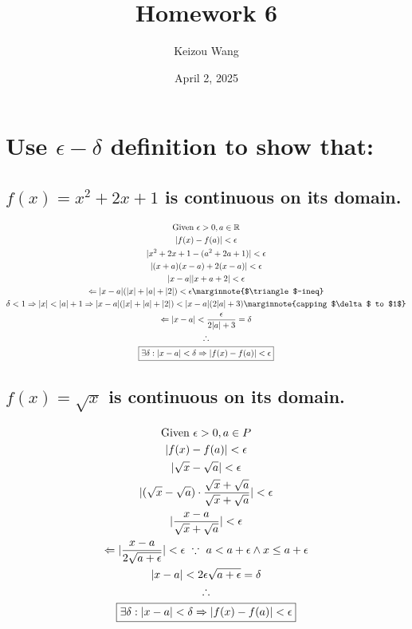 \documentclass[letterpaper]{article}
\title{Homework 6}
\author{Keizou Wang}
\date{April 2, 2025}
\DeclarePairedDelimiter\abs{\lvert}{\rvert}
\begin{document}
\maketitle

\section{Use $\epsilon-\delta$ definition to show that:}
\subsection{$f(x)=x^2+2x+1$ is continuous on its domain.}
\begin{gather*}
	\text{Given } \epsilon>0,a\in\mathbb{R} \\
	\abs{f(x)-f(a)}<\epsilon \\
	\abs{x^2+2x+1-(a^2+2a+1)}<\epsilon \\
	\abs{(x+a)(x-a)+2(x-a)}<\epsilon \\
	\abs{x-a}\abs{x+a+2}<\epsilon \\
	\Leftarrow \abs{x-a}(\abs{x}+\abs{a}+\abs{2})<\epsilon \marginnote{$\triangle$-ineq} \\
	\delta<1\Rightarrow\abs{x}<\abs{a}+1 \Rightarrow \abs{x-a}(\abs{x}+\abs{a}+\abs{2})<\abs{x-a}(2\abs{a}+3)\marginnote{capping $\delta$ to $1$} \\
	\Leftarrow \abs{x-a}<\frac{\epsilon}{2\abs{a}+3}=\delta \\
	\therefore \\
	\boxed{\exists\delta:|x-a|<\delta\Rightarrow\abs{f(x)-f(a)}<\epsilon}
\end{gather*}
\subsection{$f(x)=\sqrt{x}$ is continuous on its domain.}
\begin{gather*}
	\text{Given } \epsilon>0,a\in P \\
	\abs{f(x)-f(a)}<\epsilon \\
	\abs{\sqrt{x}-\sqrt{a}}<\epsilon \\
	\abs{(\sqrt{x}-\sqrt{a})\cdot\frac{\sqrt{x}+\sqrt{a}}{\sqrt{x}+\sqrt{a}}}<\epsilon \\
	\abs{\frac{x-a}{\sqrt{x}+\sqrt{a}}}<\epsilon \\
	\Leftarrow\abs{\frac{x-a}{2\sqrt{a+\epsilon}}}<\epsilon \text{ } \because \text{ } a<a+\epsilon\land x\leq a+\epsilon \\
	\abs{x-a}<2\epsilon\sqrt{a+\epsilon}=\delta \\
	\therefore \\
	\boxed{\exists\delta:|x-a|<\delta\Rightarrow\abs{f(x)-f(a)}<\epsilon}
\end{gather*}
\end{document}
